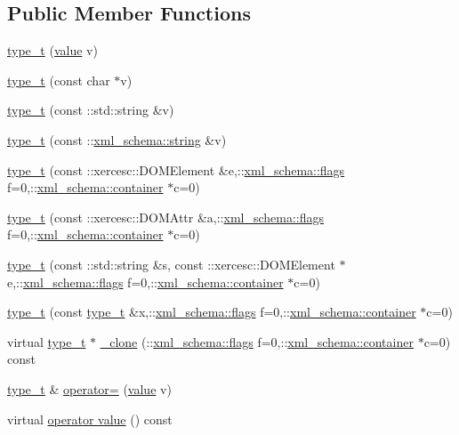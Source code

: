 \subsection*{Public Member Functions}
\begin{DoxyCompactItemize}
\item 
\hyperlink{classtype__t_aef3e1ffc719f81b6e64dfc82d3e68fb4}{type\-\_\-t} (\hyperlink{classtype__t_a2cd65d363cac2eb0d81f2e61f5b6bcff}{value} v)
\item 
\hyperlink{classtype__t_a25df0d2d77574789bf604d129d97628f}{type\-\_\-t} (const char $\ast$v)
\item 
\hyperlink{classtype__t_a9a28b05c320cda87aa8a4e983e23ab3a}{type\-\_\-t} (const \-::std\-::string \&v)
\item 
\hyperlink{classtype__t_a4e0bc111a2870ce6751bcf7853f85f77}{type\-\_\-t} (const \-::\hyperlink{namespacexml__schema_ac0cec83a330f0024e4e318b3deac5104}{xml\-\_\-schema\-::string} \&v)
\item 
\hyperlink{classtype__t_a63e1768303f3920d245c2560979c2448}{type\-\_\-t} (const \-::xercesc\-::\-D\-O\-M\-Element \&e,\-::\hyperlink{namespacexml__schema_a0612287d030cb2732d31a45b258fdc87}{xml\-\_\-schema\-::flags} f=0,\-::\hyperlink{namespacexml__schema_ada9aa30dc722e93ee2ed7243085402a5}{xml\-\_\-schema\-::container} $\ast$c=0)
\item 
\hyperlink{classtype__t_a85e514cc4d8c9aaa43fb780d4d1cdea8}{type\-\_\-t} (const \-::xercesc\-::\-D\-O\-M\-Attr \&a,\-::\hyperlink{namespacexml__schema_a0612287d030cb2732d31a45b258fdc87}{xml\-\_\-schema\-::flags} f=0,\-::\hyperlink{namespacexml__schema_ada9aa30dc722e93ee2ed7243085402a5}{xml\-\_\-schema\-::container} $\ast$c=0)
\item 
\hyperlink{classtype__t_af6fbe42125b54356daaf31ab4aff7831}{type\-\_\-t} (const \-::std\-::string \&s, const \-::xercesc\-::\-D\-O\-M\-Element $\ast$e,\-::\hyperlink{namespacexml__schema_a0612287d030cb2732d31a45b258fdc87}{xml\-\_\-schema\-::flags} f=0,\-::\hyperlink{namespacexml__schema_ada9aa30dc722e93ee2ed7243085402a5}{xml\-\_\-schema\-::container} $\ast$c=0)
\item 
\hyperlink{classtype__t_aa021e327a8ab0832078768e33cf794f9}{type\-\_\-t} (const \hyperlink{classtype__t}{type\-\_\-t} \&x,\-::\hyperlink{namespacexml__schema_a0612287d030cb2732d31a45b258fdc87}{xml\-\_\-schema\-::flags} f=0,\-::\hyperlink{namespacexml__schema_ada9aa30dc722e93ee2ed7243085402a5}{xml\-\_\-schema\-::container} $\ast$c=0)
\item 
virtual \hyperlink{classtype__t}{type\-\_\-t} $\ast$ \hyperlink{classtype__t_a0e130a014f1dec009183e9aa812db836}{\-\_\-clone} (\-::\hyperlink{namespacexml__schema_a0612287d030cb2732d31a45b258fdc87}{xml\-\_\-schema\-::flags} f=0,\-::\hyperlink{namespacexml__schema_ada9aa30dc722e93ee2ed7243085402a5}{xml\-\_\-schema\-::container} $\ast$c=0) const 
\item 
\hyperlink{classtype__t}{type\-\_\-t} \& \hyperlink{classtype__t_a891cac5504129725bbfb0930cdebae1d}{operator=} (\hyperlink{classtype__t_a2cd65d363cac2eb0d81f2e61f5b6bcff}{value} v)
\item 
virtual \hyperlink{classtype__t_ac7d7e7922ca4fd492aa55851fe8fcf17}{operator value} () const 
\end{DoxyCompactItemize}
